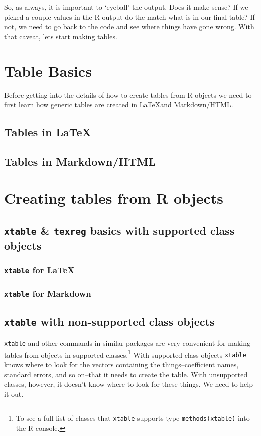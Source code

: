 \documentclass[ChapterTOCs,krantz1]{krantz}\usepackage{graphicx, color}
\begin{document}
So, as always, it is important to `eyeball' the output. Does it make
sense? If we picked a couple values in the R output do the
match what is in our final table? If not, we need to go back to the code
and see where things have gone wrong. With that caveat, lets start
making tables.

\section{Table Basics}

Before getting into the details of how to create tables from R objects we need to first learn how generic tables are created in \LaTeX and Markdown/HTML.

\subsection{Tables in \LaTeX}

\subsection{Tables in Markdown/HTML}

\section{Creating tables from R objects}

\subsection{\texttt{xtable} \& \texttt{texreg} basics with supported
class objects}

\subsubsection{\texttt{xtable} for \LaTeX}

\subsubsection{\texttt{xtable} for Markdown}

\subsection{\texttt{xtable} with non-supported class objects}

{\tt{xtable}} and other commands in similar packages are very convenient for making tables from objects in supported classes.\footnote{To see a full list of classes that {\tt{xtable}} supports type {\tt{methods(xtable)}} into the R console.} With supported class objects {\tt{xtable}} knows where to look for the vectors containing the things--coefficient names, standard errors, and so on--that it needs to create the table. With unsupported classes, however, it doesn't know where to look for these things. We need to help it out. 
\end{document}
